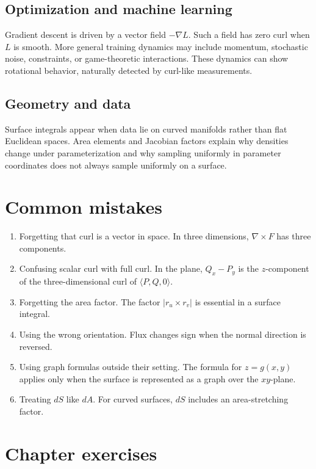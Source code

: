 \documentclass[11pt]{article}
\newcommand{\grad}{\nabla}
\begin{document}
\subsection*{Optimization and machine learning}
Gradient descent is driven by a vector field $-\grad L$. Such a field has zero curl when $L$ is smooth. More general training dynamics may include momentum, stochastic noise, constraints, or game-theoretic interactions. These dynamics can show rotational behavior, naturally detected by curl-like measurements.

\subsection*{Geometry and data}
Surface integrals appear when data lie on curved manifolds rather than flat Euclidean spaces. Area elements and Jacobian factors explain why densities change under parameterization and why sampling uniformly in parameter coordinates does not always sample uniformly on a surface.

\section{Common mistakes}

\begin{enumerate}
  \item Forgetting that curl is a vector in space. In three dimensions, $\grad\times F$ has three components.
  \item Confusing scalar curl with full curl. In the plane, $Q_x-P_y$ is the $z$-component of the three-dimensional curl of $\langle P,Q,0\rangle$.
  \item Forgetting the area factor. The factor $|r_u\times r_v|$ is essential in a surface integral.
  \item Using the wrong orientation. Flux changes sign when the normal direction is reversed.
  \item Using graph formulas outside their setting. The formula for $z=g(x,y)$ applies only when the surface is represented as a graph over the $xy$-plane.
  \item Treating $dS$ like $dA$. For curved surfaces, $dS$ includes an area-stretching factor.
\end{enumerate}

\section{Chapter exercises}
\end{document}
